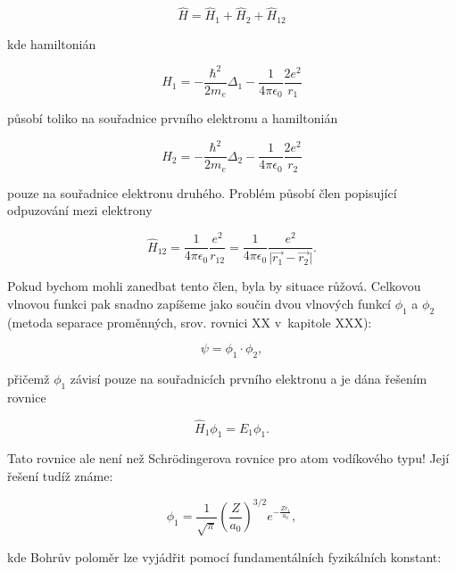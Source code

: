 \begin{equation}
\hat{H} = \hat{H}_1 + \hat{H}_2 + \hat{H}_{12}
\label{rov:VE-2}
\end{equation}

\noindent kde hamiltonián 

\begin{equation}
\hat{H}_1 = - \frac{\hbar^2}{2 m_e} \Delta_1 - \frac{1}{4 \pi \epsilon_0} \frac{2 e^2}{r_1}
\label{rov:VE-3}
\end{equation} 

\noindent působí toliko na souřadnice prvního elektronu a hamiltonián 

\begin{equation}
\hat{H}_2 = - \frac{\hbar^2}{2 m_e} \Delta_2 - \frac{1}{4 \pi \epsilon_0} \frac{2 e^2}{r_2}
\label{rov:VE-4}
\end{equation}

\noindent pouze na souřadnice elektronu druhého. Problém působí člen popisující odpuzování mezi elektrony 

\begin{equation}
\hat{H}_{12} = \frac{1}{4 \pi \epsilon_0} \frac{e^2}{r_{12}} = \frac{1}{4 \pi \epsilon_0} \frac{e^2}{\vert \vec{r_1} - \vec{r_2} \vert}. 
\label{rov:VE-5}
\end{equation}

Pokud bychom mohli zanedbat tento člen, byla by situace růžová. Celkovou vlnovou funkci pak snadno zapíšeme jako součin dvou vlnových funkcí $\phi_1$ a $\phi_2$ (metoda separace proměnných, srov. rovnici XX v~kapitole XXX):

\begin{equation}
\psi = \phi_1 \cdot \phi_2,
\label{rov:VE-6}
\end{equation}

\noindent přičemž $\phi_1$ závisí pouze na souřadnicích prvního elektronu a je dána řešením rovnice

\begin{equation}
\hat{H}_1 \phi_1 = E_1 \phi_1.
\label{rov:VE-7}
\end{equation}

Tato rovnice ale není než  Schr\"odingerova rovnice pro atom vodíkového typu! Její řešení tudíž známe:

\begin{equation}
\phi_1 = \frac{1}{\sqrt{\pi}} \left(\frac{Z}{a_0} \right)^{3/2} e^{-\frac{Z r_1}{a_0}},
\label{rov:VE-8}
\end{equation}

\noindent kde Bohrův poloměr lze vyjádřit pomocí fundamentálních fyzikálních konstant:

